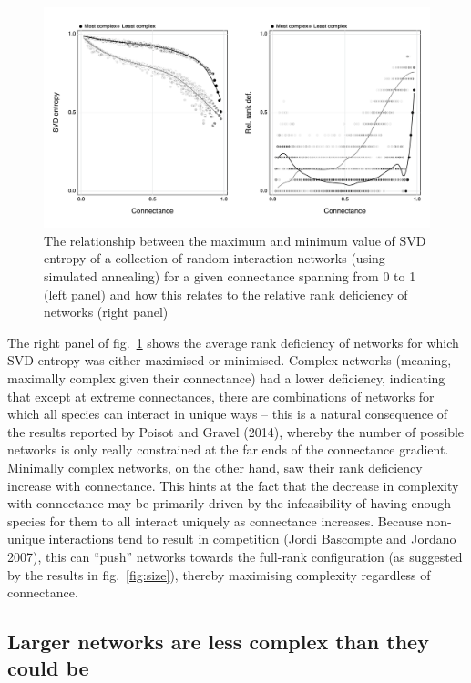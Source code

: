\documentclass[10pt,oneside]{article}
\makeatletter
\def\maxwidth{\ifdim\Gin@nat@width>\linewidth\linewidth
\else\Gin@nat@width\fi}
\let\Oldincludegraphics\includegraphics
\renewcommand{\includegraphics}[1]{\Oldincludegraphics[width=\maxwidth]{#1}}
\makeatother
\begin{document}
\begin{figure}
\hypertarget{fig:simann}{%
\centering
\includegraphics{figures/minmax_combined.png}
\caption{The relationship between the maximum and minimum value of SVD
entropy of a collection of random interaction networks (using simulated
annealing) for a given connectance spanning from 0 to 1 (left panel) and
how this relates to the relative rank deficiency of networks (right
panel)}\label{fig:simann}
}
\end{figure}

The right panel of fig.~\ref{fig:simann} shows the average rank
deficiency of networks for which SVD entropy was either maximised or
minimised. Complex networks (meaning, maximally complex given their
connectance) had a lower deficiency, indicating that except at extreme
connectances, there are combinations of networks for which all species
can interact in unique ways -- this is a natural consequence of the
results reported by Poisot and Gravel (2014), whereby the number of
possible networks is only really constrained at the far ends of the
connectance gradient. Minimally complex networks, on the other hand, saw
their rank deficiency increase with connectance. This hints at the fact
that the decrease in complexity with connectance may be primarily driven
by the infeasibility of having enough species for them to all interact
uniquely as connectance increases. Because non-unique interactions tend
to result in competition (Jordi Bascompte and Jordano 2007), this can
``push'' networks towards the full-rank configuration (as suggested by
the results in fig.~\ref{fig:size}), thereby maximising complexity
regardless of connectance.

\hypertarget{larger-networks-are-less-complex-than-they-could-be}{%
\subsection{Larger networks are less complex than they could
be}\label{larger-networks-are-less-complex-than-they-could-be}}
\end{document}
